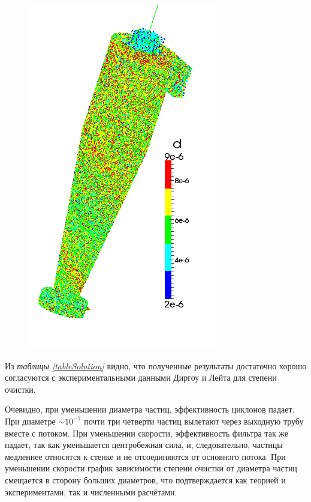 \begin{figure}[h]
\begin{minipage}{0.2\linewidth}
	\end{minipage}
		\hspace{-1em}
	\begin{minipage}{0.2\linewidth}
		\includegraphics[scale=0.3]{t10}
	\end{minipage}
	\label{fig:t1}
\end{figure}
Из \textit{таблицы \ref{tableSolution}} видно, что полученные результаты достаточно хорошо согласуются с экспериментальными данными Диргоу и Лейта для степени очистки.

Очевидно, при уменьшении диаметра частиц, эффективность циклонов падает. При диаметре $ \sim 10^{-7}$ почти три четверти частиц вылетают через выходную трубу вместе с потоком. При уменьшении скорости, эффективность фильтра так же падает, так как уменьшается центробежная сила, и, следовательно, частицы медленнее относятся к стенке и не отсоединяются от основного потока. При уменьшении скорости график зависимости степени очистки от диаметра частиц смещается в сторону больших диаметров, что подтверждается как теорией и экспериментами, так и численными расчётами.